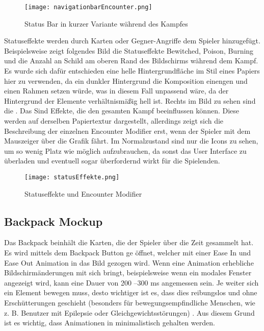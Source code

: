 \begin{figure}[H]
    \centering
    \texttt{[image: navigationbarEncounter.png]}
    \caption{Status Bar in kurzer Variante während des Kampfes}
\end{figure}

Statuseffekte werden durch Karten oder Gegner-Angriffe dem Spieler hinzugefügt. Beispielsweise zeigt folgendes Bild die Statuseffekte Bewitched, Poison, Burning und die Anzahl an Schild am oberen Rand des Bildschirms während dem Kampf. Es wurde sich dafür entschieden eine helle Hintergrundfläche im Stil eines Papiers hier zu verwenden, da ein dunkler Hintergrund die Komposition einengen und einen Rahmen setzen würde, was in diesem Fall unpassend wäre, da der Hintergrund der Elemente verhältnismäßig hell ist. Rechts im Bild zu sehen sind die
.
Das Sind Effekte, die den gesamten Kampf beeinflussen können. Diese werden auf derselben Papiertextur dargestellt, allerdings zeigt sich die Beschreibung der einzelnen Encounter Modifier erst, wenn der Spieler mit dem Mauszeiger über die Grafik fährt. Im Normalzustand sind nur die Icons zu sehen, um so wenig Platz wie möglich aufzubrauchen, da sonst das User Interface zu überladen und eventuell sogar überfordernd wirkt für die Spielenden.

\begin{figure}[H]
    \centering
    \texttt{[image: statusEffekte.png]}
    \caption{Statuseffekte und Encounter Modifier}
\end{figure}

\subsection{Backpack Mockup}

Das Backpack beinhält die Karten, die der Spieler über die Zeit gesammelt hat. Es wird mittels dem Backpack Button ge
öffnet, welcher mit einer Ease In und Ease Out Animation in das Bild gezogen wird. Wenn eine Animation erhebliche
Bildschirmänderungen mit sich bringt, beispielsweise wenn ein modales Fenster angezeigt wird, kann eine Dauer von 200
–300 ms angemessen sein. Je weiter sich ein Element bewegen muss, desto wichtiger ist es, dass dies reibungslos und
ohne Erschütterungen geschieht (besonders für bewegungsempfindliche Menschen, wie z. B. Benutzer mit Epilepsie oder
Gleichgewichtsstörungen) . Aus diesem Grund ist es wichtig, dass Animationen in \FF
minimalistisch gehalten werden.

